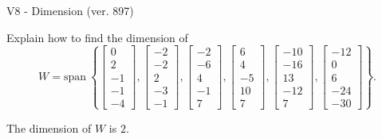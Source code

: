 \begin{exercise}
  \begin{exerciseTitle}V8 - Dimension (ver. 897)\end{exerciseTitle}
  \begin{exerciseStatement}
    Explain how to find the dimension of 
\[W=\mathrm{span}\ \left\{\left[\begin{array}{r}
0 \\
2 \\
-1 \\
-1 \\
-4
\end{array}\right] , \left[\begin{array}{r}
-2 \\
-2 \\
2 \\
-3 \\
-1
\end{array}\right] , \left[\begin{array}{r}
-2 \\
-6 \\
4 \\
-1 \\
7
\end{array}\right] , \left[\begin{array}{r}
6 \\
4 \\
-5 \\
10 \\
7
\end{array}\right] , \left[\begin{array}{r}
-10 \\
-16 \\
13 \\
-12 \\
7
\end{array}\right] , \left[\begin{array}{r}
-12 \\
0 \\
6 \\
-24 \\
-30
\end{array}\right]\right\}.\]



  \end{exerciseStatement}
  \begin{exerciseAnswer}
   The dimension of \(W\) is  \(2\).
  


  \end{exerciseAnswer}
\end{exercise}